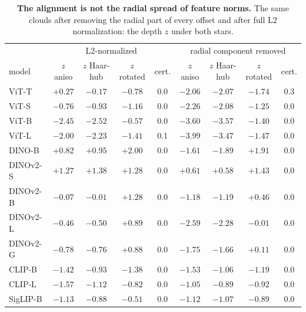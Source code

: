 \begin{table}[H]
\centering
\scriptsize
\setlength{\tabcolsep}{2.2pt}
\begingroup
\footnotesize
\setlength{\tabcolsep}{3pt}
\begin{tabular}{lcccc|cccc}
\toprule
& \multicolumn{4}{c|}{L2-normalized} & \multicolumn{4}{c}{radial component removed} \\
model & $z$ aniso & $z$ Haar-hub & $z$ rotated & cert. & $z$ aniso & $z$ Haar-hub & $z$ rotated & cert. \\
\midrule
ViT-T & $+0.27$ & $-0.17$ & $-0.78$ & 0.0 & $-2.06$ & $-2.07$ & $-1.74$ & 0.3 \\
ViT-S & $-0.76$ & $-0.93$ & $-1.16$ & 0.0 & $-2.26$ & $-2.08$ & $-1.25$ & 0.0 \\
ViT-B & $-2.45$ & $-2.52$ & $-0.57$ & 0.0 & $-3.60$ & $-3.57$ & $-1.40$ & 0.0 \\
ViT-L & $-2.00$ & $-2.23$ & $-1.41$ & 0.1 & $-3.99$ & $-3.47$ & $-1.47$ & 0.0 \\
\midrule
DINO-B & $+0.82$ & $+0.95$ & $+2.00$ & 0.0 & $-1.61$ & $-1.89$ & $+1.91$ & 0.0 \\
DINOv2-S & $+1.27$ & $+1.38$ & $+1.28$ & 0.0 & $+0.61$ & $+0.58$ & $+1.43$ & 0.0 \\
DINOv2-B & $-0.07$ & $-0.01$ & $+1.28$ & 0.0 & $-1.18$ & $-1.19$ & $+0.46$ & 0.0 \\
DINOv2-L & $-0.46$ & $-0.50$ & $+0.89$ & 0.0 & $-2.59$ & $-2.28$ & $-0.01$ & 0.0 \\
DINOv2-G & $-0.78$ & $-0.76$ & $+0.88$ & 0.0 & $-1.75$ & $-1.66$ & $+0.11$ & 0.0 \\
\midrule
CLIP-B & $-1.42$ & $-0.93$ & $-1.38$ & 0.0 & $-1.53$ & $-1.06$ & $-1.19$ & 0.0 \\
CLIP-L & $-1.57$ & $-1.12$ & $-0.82$ & 0.0 & $-1.05$ & $-0.89$ & $-0.92$ & 0.0 \\
SigLIP-B & $-1.13$ & $-0.88$ & $-0.51$ & 0.0 & $-1.12$ & $-1.07$ & $-0.89$ & 0.0 \\
\bottomrule
\end{tabular}
\par\vspace{2pt}
\endgroup
\caption{\textbf{The alignment is not the radial spread of feature norms.} The same clouds after removing the radial part of every offset and after full L2 normalization: the depth $z$ under both stars.
}
\label{tab:q4-depth-e}
\end{table}
